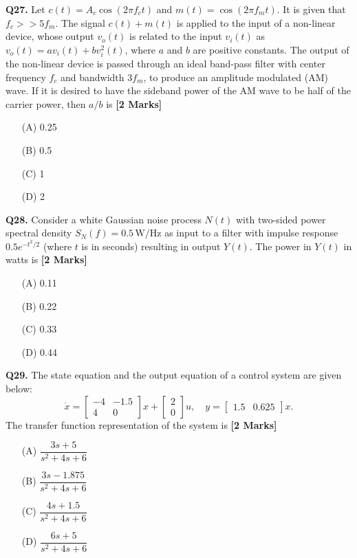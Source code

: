\documentclass[11pt]{article}
\newcommand{\questionb}[2]{
    \noindent\textbf{Q#2.} #1 \hfill \textbf{[2 Marks]}
}
\begin{document}
\vspace{0.5cm}

\questionb{Let $c(t) = A_c \cos(2\pi f_c t)$ and $m(t) = \cos(2\pi f_m t)$. It is given that $f_c >> 5f_m$. The signal $c(t) + m(t)$ is applied to the input of a non-linear device, whose output $v_o(t)$ is related to the input $v_i(t)$ as $v_o(t) = av_i(t) + bv_i^2(t)$, where $a$ and $b$ are positive constants. The output of the non-linear device is passed through an ideal band-pass filter with center frequency $f_c$ and bandwidth $3f_m$, to produce an amplitude modulated (AM) wave. If it is desired to have the sideband power of the AM wave to be half of the carrier power, then $a/b$ is}{27}
\begin{enumerate}
    \item[(A)] 0.25
    \item[(B)] 0.5
    \item[(C)] 1
    \item[(D)] 2
\end{enumerate}

\vspace{0.5cm}

\questionb{Consider a white Gaussian noise process $N(t)$ with two-sided power spectral density $S_N(f) = 0.5\,\text{W/Hz}$ as input to a filter with impulse response $0.5e^{-t^2/2}$ (where $t$ is in seconds) resulting in output $Y(t)$. The power in $Y(t)$ in watts is}{28}
\begin{enumerate}
    \item[(A)] 0.11
    \item[(B)] 0.22
    \item[(C)] 0.33
    \item[(D)] 0.44
\end{enumerate}

\vspace{0.5cm}

\questionb{The state equation and the output equation of a control system are given below:
\[
\dot{x} = 
\begin{bmatrix}
-4 & -1.5 \\
4 & 0
\end{bmatrix}
x + 
\begin{bmatrix}
2 \\
0
\end{bmatrix}
u,\quad
y = 
\begin{bmatrix}
1.5 & 0.625
\end{bmatrix}
x.
\]
The transfer function representation of the system is}{29}
\begin{enumerate}
    \item[(A)] $\dfrac{3s+5}{s^2+4s+6}$
    \item[(B)] $\dfrac{3s-1.875}{s^2+4s+6}$
    \item[(C)] $\dfrac{4s+1.5}{s^2+4s+6}$
    \item[(D)] $\dfrac{6s+5}{s^2+4s+6}$
\end{enumerate}
\end{document}
